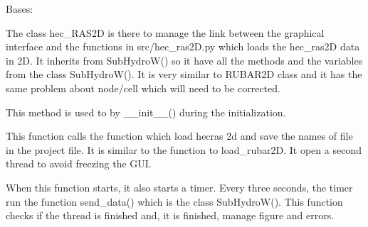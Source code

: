 \documentclass[letterpaper,10pt,english]{sphinxmanual}
\begin{document}
\begin{fulllineitems}
\label{\detokenize{index:src_GUI.hydro_GUI_2.HEC_RAS2D}}
Bases: {\hyperref[\detokenize{index:src_GUI.hydro_GUI_2.SubHydroW}]{}}

The class hec\_RAS2D is there to manage the link between the graphical interface and the functions in src/hec\_ras2D.py
which loads the hec\_ras2D data in 2D. It inherits from SubHydroW() so it have all the methods and the variables
from the class SubHydroW(). It is very similar to RUBAR2D class and it has the same problem about node/cell
which will need to be corrected.

\begin{fulllineitems}
\label{\detokenize{index:src_GUI.hydro_GUI_2.HEC_RAS2D.init_iu}}
This method is used to by \_\_init\_\_() during the initialization.

\end{fulllineitems}


\begin{fulllineitems}
\label{\detokenize{index:src_GUI.hydro_GUI_2.HEC_RAS2D.load_hec_2d_gui}}
This function calls the function which load hecras 2d and save the names of file in the project file.
It is similar to the function to load\_rubar2D. It open a second thread to avoid freezing the GUI.

When this function starts, it also starts a timer. Every three seconds, the timer run the function send\_data()
which is the class SubHydroW(). This function checks if the thread is finished and, it is finished, manage
figure and errors.

\end{fulllineitems}


\end{fulllineitems}

\end{document}
